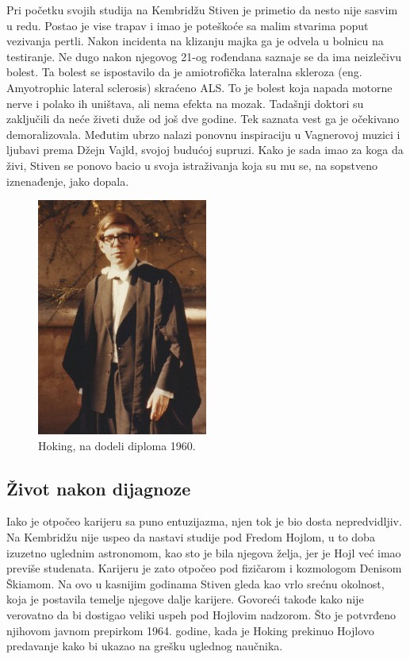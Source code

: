 \documentclass[a4paper, 12pt]{article}
\begin{document}
{Pri početku svojih studija na Kembridžu Stiven je primetio da nesto nije sasvim u 
redu. Postao je vise trapav i imao je poteškoće sa malim stvarima poput vezivanja 
pertli. Nakon incidenta na klizanju majka ga je odvela u bolnicu na testiranje. Ne 
dugo nakon njegovog 21-og rođendana saznaje se da ima neizlečivu bolest. Ta bolest 
se ispostavilo da je amiotrofička lateralna skleroza (eng. Amyotrophic lateral 
sclerosis) skraćeno ALS. To je bolest koja napada motorne nerve i polako ih uništava, 
ali nema efekta na mozak. Tadašnji doktori su zaključili da neće živeti duže od još 
dve godine. Tek saznata vest ga je očekivano demoralizovala. Međutim ubrzo nalazi ponovnu 
inspiraciju u Vagnerovoj muzici i ljubavi prema Džejn Vajld, svojoj budućoj supruzi. 
Kako je sada imao za koga da živi, Stiven se ponovo bacio u svoja istraživanja koja 
su mu se, na sopstveno iznenađenje, jako dopala. \cite{hawkingcom}

\begin{figure}[h!]
\centering
\includegraphics[width=0.5\textwidth]{Hoking,PreDijagnoze.jpg}
\caption{Hoking, na dodeli diploma 1960.}
\end{figure}

\subsection{Život nakon dijagnoze}
Iako je otpočeo karijeru sa puno entuzijazma, njen tok je bio dosta nepredvidljiv. 
Na Kembridžu nije uspeo da nastavi studije pod Fredom Hojlom, u to doba izuzetno 
uglednim astronomom, kao sto je bila njegova želja, jer je Hojl već imao previše 
studenata. Karijeru je zato otpočeo pod fizičarom i kozmologom Denisom Škiamom. 
Na ovo u kasnijim godinama Stiven gleda kao vrlo srećnu okolnost, koja je postavila 
temelje njegove dalje karijere. Govoreći takođe kako nije verovatno da bi dostigao 
veliki uspeh pod Hojlovim nadzorom. Što je potvrđeno njihovom javnom prepirkom 1964. 
godine, kada je Hoking prekinuo Hojlovo predavanje kako bi ukazao na grešku uglednog 
naučnika. \medskip \cite{kratkaistorija}
\newpage

}
\end{document}
